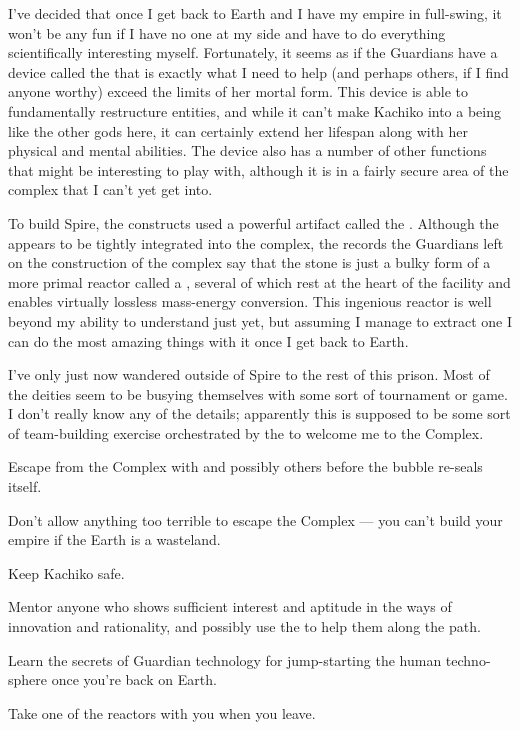 \documentclass[char]{guardians}
\begin{document}
I've decided that once I get back to Earth and I have my empire in full-swing, it won't be any fun if I have no one at my side and have to do everything scientifically interesting myself. Fortunately, it seems as if the Guardians have a device called the \assembler{} that is exactly what I need to help \cKachiko{} (and perhaps others, if I find anyone worthy) exceed the limits of her mortal form. This device is able to fundamentally restructure entities, and while it can't make Kachiko into a being like the other gods here, it can certainly extend her lifespan along with her physical and mental abilities. The device also has a number of other functions that might be interesting to play with, although it is in a fairly secure area of the complex that I can't yet get into.

To build Spire, the constructs used a powerful artifact called the \stone{}. Although the \stone{} appears to be tightly integrated into the complex, the records the Guardians left on the construction of the complex say that the stone is just a bulky form of a more primal reactor called a \core{}, several of which rest at the heart of the facility and enables virtually lossless mass-energy conversion. This ingenious reactor is well beyond my ability to understand just yet, but assuming I manage to extract one I can do the most amazing things with it once I get back to Earth.

I've only just now wandered outside of Spire to the rest of this prison. Most of the deities seem to be busying themselves with some sort of tournament or game. I don't really know any of the details; apparently this is supposed to be some sort of team-building exercise orchestrated by the \cCaretaker{} to welcome me to the Complex.




\begin{itemz}[Goals]
  \item Escape from the Complex with \cKachiko{} and possibly others before the bubble re-seals itself.
  \item Don't allow anything too terrible to escape the Complex --- you can't build your empire if the Earth is a wasteland.
  \item Keep Kachiko safe.
  \item Mentor anyone who shows sufficient interest and aptitude in the ways of innovation and rationality, and possibly use the \assembler{} to help them along the path.
  \item Learn the secrets of Guardian technology for jump-starting the human techno-sphere once you're back on Earth.
  \item Take one of the \core{} reactors with you when you leave.
\end{itemz}
\end{document}
